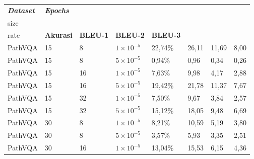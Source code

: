 

\begin{longtable}[c]{|l|l|l|l|l|l|l|l|}
    \hline
    \textit{\textbf{Dataset}} &
      \textit{\textbf{Epochs}} &
      \textit{\textbf{\begin{tabular}[c]{@{}l@{}}Batch \\ size\end{tabular}}} &
      \textit{\textbf{\begin{tabular}[c]{@{}l@{}}Learning \\ rate\end{tabular}}} &
      \textbf{Akurasi} &
      \textbf{BLEU-1} &
      \textbf{BLEU-2} &
      \textbf{BLEU-3} \\ \hline
    \endfirsthead
    \endhead
    PathVQA & 15 & 8  & $1 \times 10^{-5}$ & 22,74\% & 26,11 & 11,69 & 8,00  \\ \hline
    PathVQA & 15 & 8  & $5 \times 10^{-5}$ & 0,94\%  & 0,96  & 0,34  & 0,26  \\ \hline
    PathVQA & 15 & 16 & $1 \times 10^{-5}$ & 7,63\%  & 9,98  & 4,17  & 2,88  \\ \hline
    PathVQA & 15 & 16 & $5 \times 10^{-5}$ & 19,42\% & 21,78 & 11,37 & 7,67  \\ \hline
    PathVQA & 15 & 32 & $1 \times 10^{-5}$ & 7,50\%  & 9,67  & 3,84  & 2,57  \\ \hline
    PathVQA & 15 & 32 & $5 \times 10^{-5}$ & 15,12\% & 18,05 & 9,48  & 6,69  \\ \hline
    PathVQA & 30 & 8  & $1 \times 10^{-5}$ & 8,21\%  & 10,59 & 5,19  & 3,80  \\ \hline
    PathVQA & 30 & 8  & $5 \times 10^{-5}$ & 3,57\%  & 5,93  & 3,35  & 2,51  \\ \hline
    PathVQA & 30 & 16 & $1 \times 10^{-5}$ & 13,04\% & 15,53 & 6,15  & 4,36  \\ \hline

\end{longtable}
